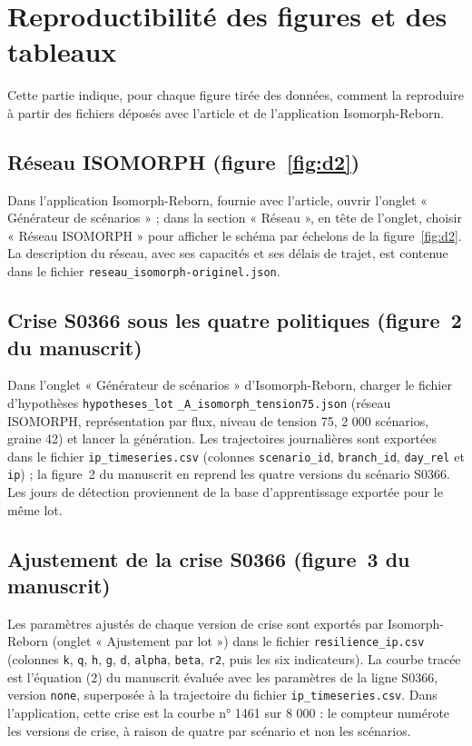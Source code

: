\section{Reproductibilité des figures et des tableaux}
\label{sec:S7}
\sloppy


Cette partie indique, pour chaque figure tirée des données, comment la reproduire à partir des fichiers déposés avec l'article et de l'application Isomorph-Reborn.

\subsection*{Réseau ISOMORPH (figure~\ref{fig:d2})}

Dans l'application Isomorph-Reborn, fournie avec l'article, ouvrir l'onglet « Générateur de scénarios » ; dans la section « Réseau », en tête de l'onglet, choisir « Réseau ISOMORPH » pour afficher le schéma par échelons de la figure~\ref{fig:d2}. La description du réseau, avec ses capacités et ses délais de trajet, est contenue dans le fichier \texttt{reseau\_isomorph-originel.json}.

\subsection*{Crise S0366 sous les quatre politiques (figure~2 du manuscrit)}

Dans l'onglet « Générateur de scénarios » d'Isomorph-Reborn, charger le fichier d'hypothèses \texttt{hypotheses\_lot} \texttt{\_A\_isomorph\_tension75.json} (réseau ISOMORPH, représentation par flux, niveau de tension 75, 2 000 scénarios, graine 42) et lancer la génération. Les trajectoires journalières sont exportées dans le fichier \texttt{ip\_timeseries.csv} (colonnes \texttt{scenario\_id}, \texttt{branch\_id}, \texttt{day\_rel} et \texttt{ip}) ; la figure~2 du manuscrit en reprend les quatre versions du scénario S0366. Les jours de détection proviennent de la base d'apprentissage exportée pour le même lot.

\subsection*{Ajustement de la crise S0366 (figure~3 du manuscrit)}

Les paramètres ajustés de chaque version de crise sont exportés par Isomorph-Reborn (onglet « Ajustement par lot ») dans le fichier \texttt{resilience\_ip.csv} (colonnes \texttt{k}, \texttt{q}, \texttt{h}, \texttt{g}, \texttt{d}, \texttt{alpha}, \texttt{beta}, \texttt{r2}, puis les six indicateurs). La courbe tracée est l'équation (2) du manuscrit évaluée avec les paramètres de la ligne S0366, version \texttt{none}, superposée à la trajectoire du fichier \texttt{ip\_timeseries.csv}. Dans l'application, cette crise est la courbe n° 1461 sur 8 000 : le compteur numérote les versions de crise, à raison de quatre par scénario et non les scénarios.

